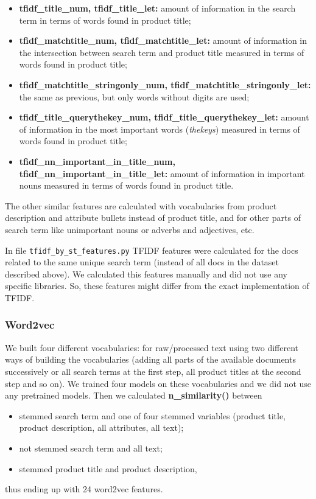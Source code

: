 \documentclass[12pt]{article}
\begin{document}
\begin{itemize}
\item \textbf{tfidf\_title\_num, tfidf\_title\_let:} amount of information in the search term in terms of words found in product title;
\item \textbf{tfidf\_matchtitle\_num, tfidf\_matchtitle\_let:} amount of information in the intersection between search term and product title measured in terms of words found in product title;
\item \textbf{tfidf\_matchtitle\_stringonly\_num, tfidf\_matchtitle\_stringonly\_let:} the same as previous, but only words without digits are used;
\item \textbf{tfidf\_title\_querythekey\_num, tfidf\_title\_querythekey\_let:} amount of information in the most important words (\emph{thekeys}) measured in terms of words found in product title;
\item \textbf{tfidf\_nn\_important\_in\_title\_num, tfidf\_nn\_important\_in\_title\_let:} amount of information in important nouns measured in terms of words found in product title.
\end{itemize}

The other similar features are calculated with vocabularies from product description and attribute bullets instead of product title, and for other parts of search term like unimportant nouns or adverbs and adjectives, etc.

In file \texttt{tfidf\_by\_st\_features.py} TFIDF features were calculated for the docs related to the same unique search term (instead of all docs in the dataset described above). We calculated this features manually and did not use any specific libraries. So, these features might differ from the exact implementation of TFIDF.


\subsubsection{Word2vec}
\label{subsubsec:word2vec_IandK}

We built four different vocabularies: for raw/processed text using two different ways of  building the vocabularies (adding all parts of the available documents successively or  all search terms at the first step, all product titles at the second step and so on). We trained four models on these vocabularies and we did not use any pretrained models. Then we calculated \textbf{n\_similarity()} between
\begin{itemize}
\item  stemmed search term and one of four stemmed variables (product title, product
description, all attributes, all text);
\item not stemmed search term and all text;
\item stemmed product title and  product description,
\end{itemize}
thus ending up with 24 word2vec features.
\end{document}
